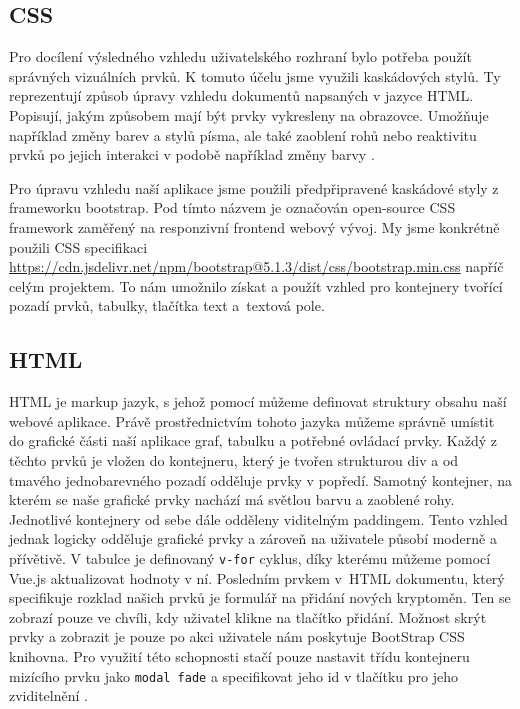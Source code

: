 \subsection{CSS}

Pro docílení výsledného vzhledu uživatelského rozhraní bylo potřeba použít správných vizuálních prvků. 
K tomuto účelu jsme využili kaskádových stylů.
Ty reprezentují způsob úpravy vzhledu dokumentů napsaných v jazyce HTML. 
Popisují, jakým způsobem mají být prvky vykresleny na obrazovce. 
Umožňuje například změny barev a stylů písma, ale také zaoblení rohů nebo reaktivitu prvků po jejich interakci v podobě například změny barvy \cite{css}.

Pro úpravu vzhledu naší aplikace jsme použili předpřipravené kaskádové styly z frameworku bootstrap. 
Pod tímto názvem je označován open-source CSS framework zaměřený na responzivní frontend webový vývoj. 
My jsme konkrétně použili CSS specifikaci \url{https://cdn.jsdelivr.net/npm/bootstrap@5.1.3/dist/css/bootstrap.min.css} napříč celým projektem. 
To nám umožnilo získat a použít vzhled pro kontejnery tvořící pozadí prvků, tabulky, tlačítka text a~textová pole.

\subsection{HTML}

HTML je markup jazyk, s jehož pomocí můžeme definovat struktury obsahu naší webové aplikace. 
Právě prostřednictvím tohoto jazyka můžeme správně umístit do grafické části naší aplikace graf, tabulku a potřebné ovládací prvky. 
Každý z těchto prvků je vložen do kontejneru, který je tvořen strukturou div a od tmavého jednobarevného pozadí odděluje prvky v popředí. 
Samotný kontejner, na kterém se naše grafické prvky nachází má světlou barvu a zaoblené rohy. 
Jednotlivé kontejnery od sebe dále odděleny viditelným paddingem. 
Tento vzhled jednak logicky odděluje grafické prvky a zároveň na uživatele působí moderně a přívětivě. 
V tabulce je definovaný \verb|v-for| cyklus, díky kterému můžeme pomocí Vue.js aktualizovat hodnoty v ní. 
Posledním prvkem v~HTML dokumentu, který specifikuje rozklad našich prvků je formulář na přidání nových kryptoměn. 
Ten se zobrazí pouze ve chvíli, kdy uživatel klikne na tlačítko přidání. 
Možnost skrýt prvky a zobrazit je pouze po akci uživatele nám poskytuje BootStrap CSS knihovna. 
Pro využití této schopnosti stačí pouze nastavit třídu kontejneru mizícího prvku jako \verb|modal fade| a specifikovat jeho id v tlačítku pro jeho zviditelnění \cite{bootstrap}.

